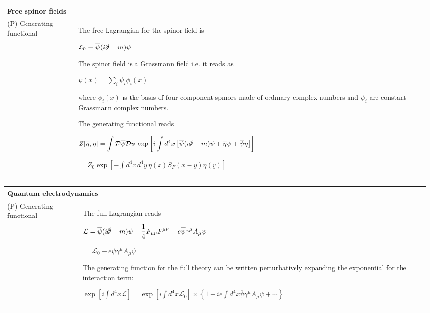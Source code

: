 \documentclass[11pt,amsmath,amssymb,latexsym]{article}
\newcommand{\toshTableBegin} 			{\begin{tabular}{|p{5cm}|p{11cm}|}}
\newcommand{\toshTableEnd} 				{\hline \end{tabular}}
\newcommand{\toshTableTitle}[1] 	{\hline \multicolumn{2}{|l|}{{\bf{#1}}}\\ \hline}
\newcommand{\toshProperty}[2]			{\hline (P) {#1} & {#2} \\}
\newcommand{\toshD}							{{\mathcal{D}}}
\newcommand{\toshL}							{{\mathcal{L}}}
\begin{document}
\toshTableBegin
\toshTableTitle{Free spinor fields}
\toshProperty{Generating functional}{The free Lagrangian for the spinor field is

\quad $\displaystyle \toshL_0 = \overline{\psi} (i\slashed{\partial} - m)\psi$

The spinor field is a Grassmann field i.e. it reads as

\quad $\psi(x) = \sum_i \psi_i \phi_i(x)$

where $\phi_i(x)$ is the basis of four-component spinors made of ordinary complex numbers and $\psi_i$ are constant Grassmann complex numbers.

\smallskip

The generating functional reads

\quad $\displaystyle Z[\overline{\eta},\eta ] = \int\toshD\overline{\psi}\toshD\psi \, \exp\left[ i \int d^4 x \left[\overline{\psi} (i\slashed{\partial}-m)\psi + \overline{\eta}\psi + \overline{\psi}\eta\right]\right]$

\smallskip

\quad \quad \quad $\displaystyle = Z_0 \exp\left[ - \int d^4 x \, d^4 y \, \overline{\eta}(x)S_F(x-y)\eta(y)\right]$


}


\toshTableEnd
\bigskip


\toshTableBegin
\toshTableTitle{Quantum electrodynamics}
\toshProperty{Generating functional}{The full Lagrangian reads

\quad $\displaystyle \toshL = \overline{\psi}(i\slashed{\partial} - m)\psi - \frac{1}{4} F_{\mu\nu} F^{\mu \nu} - e\overline{\psi}\gamma^\mu A_\mu\psi$

\quad \quad $\displaystyle = \toshL_0 - e\overline{\psi}\gamma^\mu A_\mu\psi$

The generating function for the full theory can be written perturbatively expanding the exponential for the interaction term:

\smallskip

$\displaystyle\exp\left[ i \int d^4 x \toshL \right] = \exp\left[ i \int d^4 x \toshL_0 \right] \times\left\{ 1 - ie\int d^4 x \overline{\psi}\gamma^\mu A_\mu \psi + \cdots\right\}$

}


\toshTableEnd
\bigskip

 
\end{document}
